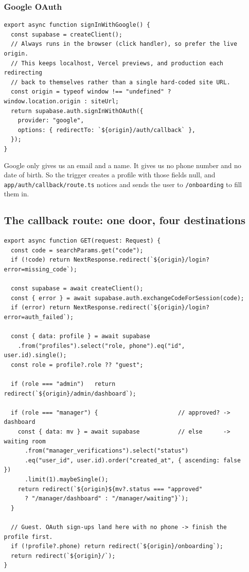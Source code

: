 \documentclass[11pt,a4paper]{article}
\newcommand{\file}[1]{\texttt{\small #1}}
\begin{document}
\subsubsection{Google OAuth}

\begin{lstlisting}[language=TS,caption={lib/auth.ts --- note the origin trick}]
export async function signInWithGoogle() {
  const supabase = createClient();
  // Always runs in the browser (click handler), so prefer the live origin.
  // This keeps localhost, Vercel previews, and production each redirecting
  // back to themselves rather than a single hard-coded site URL.
  const origin = typeof window !== "undefined" ? window.location.origin : siteUrl;
  return supabase.auth.signInWithOAuth({
    provider: "google",
    options: { redirectTo: `${origin}/auth/callback` },
  });
}
\end{lstlisting}

Google only gives us an email and a name. It gives us no phone number and no date
of birth. So the trigger creates a profile with those fields null, and
\file{app/auth/callback/route.ts} notices and sends the user to
\texttt{/onboarding} to fill them in.

\subsection{The callback route: one door, four destinations}

\begin{lstlisting}[language=TS,caption={app/auth/callback/route.ts}]
export async function GET(request: Request) {
  const code = searchParams.get("code");
  if (!code) return NextResponse.redirect(`${origin}/login?error=missing_code`);

  const supabase = await createClient();
  const { error } = await supabase.auth.exchangeCodeForSession(code);
  if (error) return NextResponse.redirect(`${origin}/login?error=auth_failed`);

  const { data: profile } = await supabase
    .from("profiles").select("role, phone").eq("id", user.id).single();
  const role = profile?.role ?? "guest";

  if (role === "admin")   return redirect(`${origin}/admin/dashboard`);

  if (role === "manager") {                       // approved? -> dashboard
    const { data: mv } = await supabase           // else      -> waiting room
      .from("manager_verifications").select("status")
      .eq("user_id", user.id).order("created_at", { ascending: false })
      .limit(1).maybeSingle();
    return redirect(`${origin}${mv?.status === "approved"
      ? "/manager/dashboard" : "/manager/waiting"}`);
  }

  // Guest. OAuth sign-ups land here with no phone -> finish the profile first.
  if (!profile?.phone) return redirect(`${origin}/onboarding`);
  return redirect(`${origin}/`);
}
\end{lstlisting}
\end{document}
